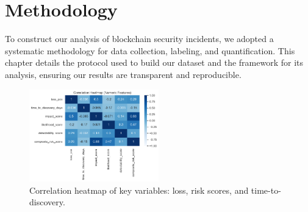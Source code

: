 \section{Methodology}
\label{sec:methodology}

To construct our analysis of blockchain security incidents, we adopted a systematic methodology for data collection, labeling, and quantification. This chapter details the protocol used to build our dataset and the framework for its analysis, ensuring our results are transparent and reproducible.

\begin{figure}[H]
\centering
\includegraphics[width=0.5\textwidth]{../figure/Figure/figures_2/G1_correlation_heatmap.png}
\caption{Correlation heatmap of key variables: loss, risk scores, and time-to-discovery.}
\label{fig:correlation_heatmap}
\end{figure}







